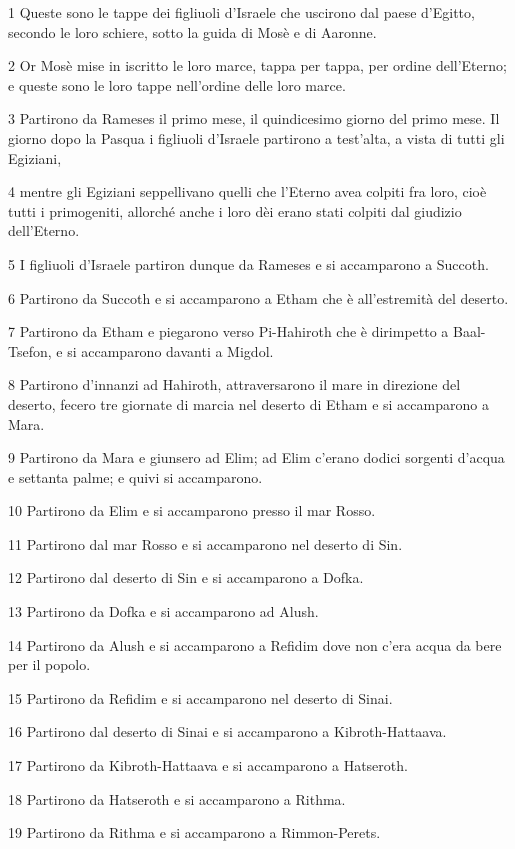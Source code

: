\par 1 Queste sono le tappe dei figliuoli d'Israele che uscirono dal paese d'Egitto, secondo le loro schiere, sotto la guida di Mosè e di Aaronne.
\par 2 Or Mosè mise in iscritto le loro marce, tappa per tappa, per ordine dell'Eterno; e queste sono le loro tappe nell'ordine delle loro marce.
\par 3 Partirono da Rameses il primo mese, il quindicesimo giorno del primo mese. Il giorno dopo la Pasqua i figliuoli d'Israele partirono a test'alta, a vista di tutti gli Egiziani,
\par 4 mentre gli Egiziani seppellivano quelli che l'Eterno avea colpiti fra loro, cioè tutti i primogeniti, allorché anche i loro dèi erano stati colpiti dal giudizio dell'Eterno.
\par 5 I figliuoli d'Israele partiron dunque da Rameses e si accamparono a Succoth.
\par 6 Partirono da Succoth e si accamparono a Etham che è all'estremità del deserto.
\par 7 Partirono da Etham e piegarono verso Pi-Hahiroth che è dirimpetto a Baal-Tsefon, e si accamparono davanti a Migdol.
\par 8 Partirono d'innanzi ad Hahiroth, attraversarono il mare in direzione del deserto, fecero tre giornate di marcia nel deserto di Etham e si accamparono a Mara.
\par 9 Partirono da Mara e giunsero ad Elim; ad Elim c'erano dodici sorgenti d'acqua e settanta palme; e quivi si accamparono.
\par 10 Partirono da Elim e si accamparono presso il mar Rosso.
\par 11 Partirono dal mar Rosso e si accamparono nel deserto di Sin.
\par 12 Partirono dal deserto di Sin e si accamparono a Dofka.
\par 13 Partirono da Dofka e si accamparono ad Alush.
\par 14 Partirono da Alush e si accamparono a Refidim dove non c'era acqua da bere per il popolo.
\par 15 Partirono da Refidim e si accamparono nel deserto di Sinai.
\par 16 Partirono dal deserto di Sinai e si accamparono a Kibroth-Hattaava.
\par 17 Partirono da Kibroth-Hattaava e si accamparono a Hatseroth.
\par 18 Partirono da Hatseroth e si accamparono a Rithma.
\par 19 Partirono da Rithma e si accamparono a Rimmon-Perets.
